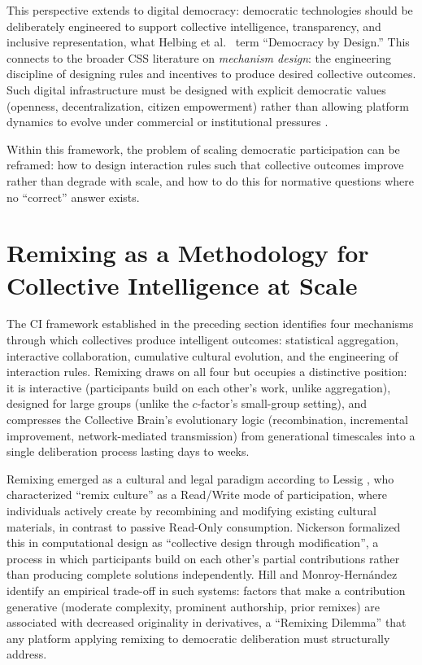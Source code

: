 \documentclass[a4paper, 12pt, twoside]{iviathesis}
\begin{document}
This perspective extends to digital democracy: democratic technologies should be deliberately engineered to support collective intelligence, transparency, and inclusive representation, what Helbing et al.\ \cite{helbing_democracy_2023} term ``Democracy by Design.'' This connects to the broader CSS literature on \textit{mechanism design}: the engineering discipline of designing rules and incentives to produce desired collective outcomes. Such digital infrastructure must be designed with explicit democratic values (openness, decentralization, citizen empowerment) rather than allowing platform dynamics to evolve under commercial or institutional pressures \cite{helbing2015nature}.

Within this framework, the problem of scaling democratic participation can be reframed: how to design interaction rules such that collective outcomes improve rather than degrade with scale, and how to do this for normative questions where no ``correct'' answer exists.

\section{Remixing as a Methodology for Collective Intelligence at Scale}
\label{sec:remixing-methodology}

The CI framework established in the preceding section identifies four mechanisms through which collectives produce intelligent outcomes: statistical aggregation, interactive collaboration, cumulative cultural evolution, and the engineering of interaction rules. Remixing draws on all four but occupies a distinctive position: it is interactive (participants build on each other's work, unlike aggregation), designed for large groups (unlike the $c$-factor's small-group setting), and compresses the Collective Brain's evolutionary logic (recombination, incremental improvement, network-mediated transmission) from generational timescales into a single deliberation process lasting days to weeks.

Remixing emerged as a cultural and legal paradigm according to Lessig \cite{lessig2008remix}, who characterized ``remix culture'' as a Read/Write mode of participation, where individuals actively create by recombining and modifying existing cultural materials, in contrast to passive Read-Only consumption. Nickerson \cite{nickerson2020remixing} formalized this in computational design as ``collective design through modification'', a process in which participants build on each other's partial contributions rather than producing complete solutions independently. Hill and Monroy-Hern\'{a}ndez \cite{hill2013remixing} identify an empirical trade-off in such systems: factors that make a contribution generative (moderate complexity, prominent authorship, prior remixes) are associated with decreased originality in derivatives, a ``Remixing Dilemma'' that any platform applying remixing to democratic deliberation must structurally address.
\end{document}
